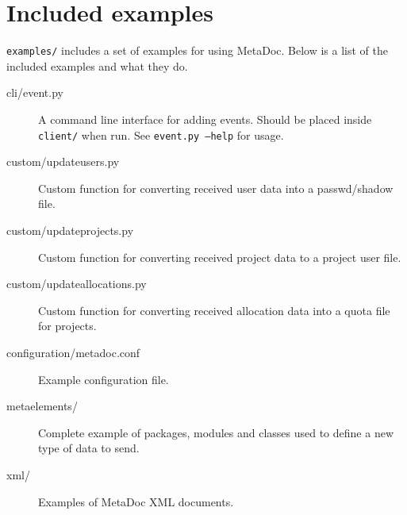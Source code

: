 \newpage
\section{Included examples}
\texttt{examples/} includes a set of examples for using MetaDoc. Below is a
list of the included examples and what they do. 

\begin{description}
    \item[cli/event.py] A command line interface for adding events. Should be
    placed inside \texttt{client/} when run. See \texttt{event.py --help} for
    usage.
    \item[custom/updateusers.py]    Custom function for converting received
    user data into a passwd/shadow file.
    \item[custom/updateprojects.py] Custom function for converting received
    project data to a project user file.
    \item[custom/updateallocations.py]  Custom function for converting received
    allocation data into a quota file for projects.
    \item[configuration/metadoc.conf]   Example configuration file.
    \item[metaelements/]    Complete example of packages, modules and classes
    used to define a new type of data to send.
    \item[xml/] Examples of MetaDoc XML documents.
\end{description}
